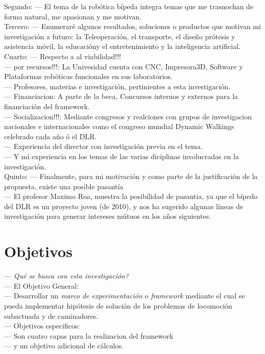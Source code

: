 \documentclass[10pt,letterpaper,oneside,onecolumn]{article}
\newcommand{\nnext}{\quad[\quad$\unrhd$\quad]}
\newcommand{\anext}{\quad[\quad$\rhd$\quad]}
\begin{document}
{  Segundo: --- El tema de la rob\'otica b\'ipeda integra temas que me trasnochan de forma natural, me apasionan y me motivan.\anext\\
  Tercero: --- Enumerar\'e algunos resultados, soluciones o productos que motivan mi investigaci\'on a futuro: la Teleoperaci\'on\anext, el transporte\anext, el dise\~no pr\'otesis y asistencia m\'ovil\anext, la educaci\'on\anext y el entretenimiento y la inteligencia artificial.\anext\\
  Cuarto: --- Respecto a al viabilidad!!!\anext\\
  --- por recursos!!!: La Univesidad cuenta con CNC, Impresora3D, Software y Plataformas rob\'oticas funcionales en sus laboratorios.\anext\\
  --- Profesores, materias e investigaci\'on, pertinientes a esta investigaci\'on.\anext\\
  --- Financiacion: A parte de la beca, Concursos internos y externos para la financiaci\'on del framework.\anext\\
  --- Socializacion!!!: Mediante congresos y realciones con grupos de investigacion nacionales e internacionales como el congreso mundial Dynamic Walkings celebrado cada a\~no \'o el DLR.\anext\\
  --- Experiencia del director con investigaci\'on previa en el tema.\anext\\
  --- Y mi experiencia en los temas de las varias diciplinas involucradas en la investigaci\'on.\nnext\\
  Quinto: --- Finalmente, para mi motivaci\'on  y como parte de la justificaci\'on de la propuesta, existe una posible pasant\'ia\\
  --- El profesor Maximo Roa, muestra la posibilidad de pasantia, ya que el b\'ipedo del DLR es un proyecto joven (de 2010), y nos ha sugerido algunas l\'ineas de investigaci\'on para generar intereses m\'utuos en los a\~nos siguientes.\\

  \section{Objetivos}
  \label{sec:objetivos}

  --- \emph{Qu\'e se busca con esta investigaci\'on?}\anext\\
  --- El Objetivo General:\\
  --- Desarrollar un \emph{marco de experimentaci\'on} o \emph{framework} mediante el cual se pueda implementar hip\'otesis de soluci\'on de los problemas de locomoci\'on subactuada y de caminadores.\anext\\
  --- Objetivos especificos:\anext\\
  --- Son cuatro capas para la realizacion del framework\anext\\
  --- y un objetivo adicional de c\'alculos.\anext\\

}
\end{document}
